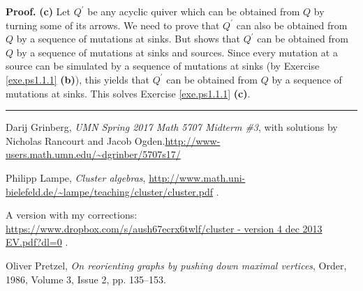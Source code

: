 \documentclass[numbers=enddot,12pt,final,onecolumn,notitlepage]{scrartcl}%
\numberwithin{exer}{section}
\theoremstyle{definition}
\newenvironment{proof}[1][Proof]{\noindent\textbf{#1.} }{\ \rule{0.5em}{0.5em}}
\newenvironment{verlong}{}{}
\begin{document}
\begin{proof}
\textbf{(c)} Let $Q^{\prime}$ be any acyclic quiver which can be obtained from
$Q$ by turning some of its arrows. We need to prove that $Q^{\prime}$ can also
be obtained from $Q$ by a sequence of mutations at sinks. But \cite[proof of
Proposition 2.2.8]{Lampe} shows that $Q^{\prime}$ can be obtained from $Q$ by
a sequence of mutations at sinks and sources. Since every mutation at a source
can be simulated by a sequence of mutations at sinks (by Exercise
\ref{exe.ps1.1.1} \textbf{(b)}), this yields that $Q^{\prime}$ can be obtained
from $Q$ by a sequence of mutations at sinks. This solves Exercise
\ref{exe.ps1.1.1} \textbf{(c)}.
\end{proof}

\begin{thebibliography}{9999999}                                                                                          %


Darij Grinberg, \textit{UMN Spring 2017 Math 5707 Midterm
\#3}, with solutions by Nicholas Rancourt and Jacob Ogden.\newline\url{http://www-users.math.umn.edu/~dgrinber/5707s17/}

Philipp Lampe, \textit{Cluster algebras},\newline%
\url{http://www.math.uni-bielefeld.de/~lampe/teaching/cluster/cluster.pdf} .

\begin{verlong}
A version with my corrections:\newline%
\url{https://www.dropbox.com/s/aush67ecrx6twlf/cluster - version 4 dec 2013 EV.pdf?dl=0}
.
\end{verlong}

Oliver Pretzel, \textit{On reorienting graphs by
pushing down maximal vertices}, Order, 1986, Volume 3, Issue 2, pp. 135--153.
\end{thebibliography}
\end{document}

